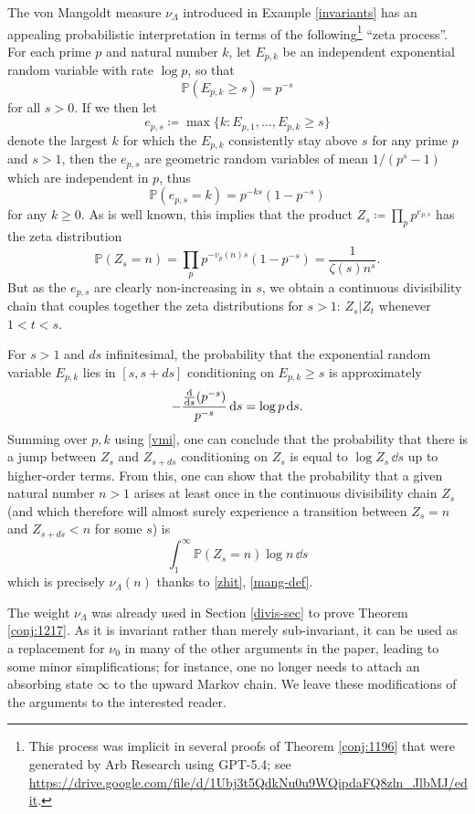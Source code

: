 \documentclass[12pt]{amsart}
\theoremstyle{definition}
\theoremstyle{remark}
\numberwithin{equation}{section}
\newcommand{\nuMangoldt}{\nu_{\Lambda}}
\newcommand{\1}{{\mathbf 1}}
\begin{document}
The von Mangoldt measure $\nuMangoldt$ introduced in Example \ref{invariants} has an appealing probabilistic interpretation in terms of the following\footnote{This process was implicit in several proofs of Theorem \ref{conj:1196} that were generated by Arb Research using GPT-5.4; see \url{https://drive.google.com/file/d/1Ubj3t5QdkNu0u9WQipdaFQ8zln_JlbMJ/edit}.} ``zeta process''.  For each prime $p$ and natural number $k$, let $E_{p,k}$ be an independent exponential random variable with rate $\log p$, so that
$$ \mathbb{P}( E_{p,k} \geq s) = p^{-s}$$
for all $s>0$.  If we then let 
$$ e_{p,s} \coloneq \max \{ k : E_{p,1},\dots,E_{p,k} \geq s \}$$
denote the largest $k$ for which the $E_{p,k}$ consistently stay above $s$ for any prime $p$ and $s > 1$, then the $e_{p,s}$ are geometric random variables of mean $1/(p^s-1)$ which are independent in $p$, thus
$$ \mathbb{P}( e_{p,s} = k) = p^{-ks} (1-p^{-s})$$
for any $k \geq 0$.  As is well known, this implies that the product $Z_s \coloneq \prod_p p^{e_{p,s}}$ has the zeta distribution
\begin{equation}\label{zhit}
\mathbb{P}(Z_s = n) = \prod_p p^{-v_p(n)s} (1-p^{-s}) = \frac{1}{\zeta(s) n^s}.
\end{equation}
But as the $e_{p,s}$ are clearly non-increasing in $s$, we obtain a continuous divisibility chain that couples together the zeta distributions for $s>1$: $Z_s | Z_t$ whenever $1 < t < s$.

For $s > 1$ and $ds$ infinitesimal, the probability that the exponential random variable $E_{p,k}$ lies in $[s,s+ds]$ conditioning on $E_{p,k} \geq s$ is approximately
$$ -\frac{\dv{s}(p^{-s})}{p^{-s}}\,\dd s = \log p\,\dd s.$$
Summing over $p, k$ using \eqref{vmi}, one can conclude that the probability that there is a jump between $Z_s$ and $Z_{s+ds}$ conditioning on $Z_s$ is equal to $\log Z_s\,\dd s$ up to higher-order terms.  From this, one can show that the probability that a given natural number $n>1$ arises at least once in the continuous divisibility chain $Z_s$ (and which therefore will almost surely experience a transition between $Z_s = n$ and $Z_{s+ds} < n$ for some $s$) is
$$ \int_1^\infty \mathbb{P}(Z_s = n) \log n\,\dd s $$
which is precisely $\nuMangoldt(n)$ thanks to \eqref{zhit}, \eqref{mang-def}.

The weight $\nuMangoldt$ was already used in Section \ref{divis-sec} to prove Theorem \ref{conj:1217}.  As it is invariant rather than merely sub-invariant, it can be used as a replacement for $\nu_0$ in many of the other arguments in the paper, leading to some minor simplifications; for instance, one no longer needs to attach an absorbing state $\infty$ to the upward Markov chain.  We leave these modifications of the arguments to the interested reader.
\end{document}
